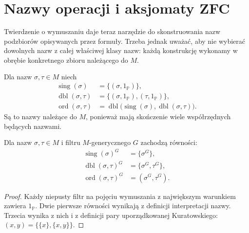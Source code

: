 \section{Nazwy operacji i aksjomaty ZFC}
Twierdzenie o wymuszaniu daje teraz
narzędzie do skonstruowania nazw podzbiorów
opisywanych przez formuły. Trzeba jednak
uważać, aby nie wybierać dowolnych nazw
z całej właściwej klasy nazw: każdą
konstrukcję wykonamy w obrębie konkretnego
zbioru należącego do $M$.

\begin{definicja}
\label{def:forcing33-finite-names}
Dla nazw $\sigma,\tau\in M$ niech
\[
\begin{aligned}
 \operatorname{sing}(\sigma)
  &=\{(\sigma,1_{\mathbb P})\},\\
 \operatorname{dbl}(\sigma,\tau)
  &=\{(\sigma,1_{\mathbb P}),
       (\tau,1_{\mathbb P})\},\\
 \operatorname{ord}(\sigma,\tau)
  &=\operatorname{dbl}\bigl(
    \operatorname{sing}(\sigma),
    \operatorname{dbl}(\sigma,\tau)\bigr).
\end{aligned}
\]
Są to nazwy należące do $M$,
ponieważ mają skończenie wiele
współrzędnych będących nazwami.
\end{definicja}

\begin{lemat}
\label{lem:forcing33-finite-eval}
Dla nazw $\sigma,\tau\in M$
i filtru $M$-generycznego $G$
zachodzą równości:
\[
\begin{aligned}
\operatorname{sing}(\sigma)^G&=\{\sigma^G\},\\
\operatorname{dbl}(\sigma,\tau)^G
  &=\{\sigma^G,\tau^G\},\\
\operatorname{ord}(\sigma,\tau)^G
  &=(\sigma^G,\tau^G).
\end{aligned}
\]
\end{lemat}
\begin{proof}
Każdy niepusty filtr na pojęciu
wymuszania z największym warunkiem
zawiera $1_{\mathbb P}$.
Dwie pierwsze równości wynikają
z definicji interpretacji nazwy.
Trzecia wynika z nich i z definicji
pary uporządkowanej Kuratowskiego:
$(x,y)=\{\{x\},\{x,y\}\}$.
\end{proof}

